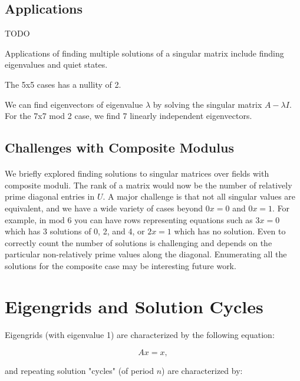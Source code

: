 \documentclass[11pt]{article}
\begin{document}
\subsection*{Applications}

TODO


Applications of finding multiple solutions of a singular matrix include finding eigenvalues and quiet states.


The 5x5 cases has a nullity of 2.


We can find eigenvectors of eigenvalue $\lambda$ by solving the singular matrix $A - \lambda I$.  For the 7x7 mod 2 case, we find 7 linearly independent eigenvectors.

\subsection*{Challenges with Composite Modulus}

\paragraph{} We briefly explored finding solutions to singular matrices over fields with composite moduli.  The rank of a matrix would now be the number of relatively prime diagonal entries in $U$.  A major challenge is that not all singular values are equivalent, and we have a wide variety of cases beyond $0x = 0$ and $0x =1$.  For example, in mod 6 you can have rows representing equations such as $3x = 0$ which has 3 solutions of 0, 2, and 4, or $2x = 1$ which has no solution.  Even to correctly count the number of solutions is challenging and depends on the particular non-relatively prime values along the diagonal.  Enumerating all the solutions for the composite case may be interesting future work.

\section*{Eigengrids and Solution Cycles}

\paragraph{} Eigengrids (with eigenvalue 1) are characterized by the following equation:

\begin{equation}
Ax = x,
\end{equation}

\noindent and repeating solution "cycles" (of period $n$) are characterized by:
\end{document}

